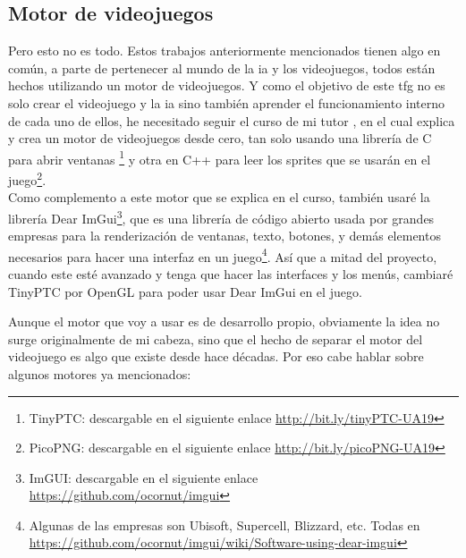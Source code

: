 \subsection{Motor de videojuegos}
Pero esto no es todo. Estos trabajos anteriormente mencionados tienen algo en común, a parte de pertenecer al mundo de la \gls{ia} y los videojuegos, todos están hechos utilizando un motor de videojuegos. Y como el objetivo de este \gls{tfg} no es solo crear el videojuego y la \gls{ia} sino también aprender el funcionamiento interno de cada uno de ellos, he necesitado seguir el curso de mi tutor \cite{CursoMotorC++} , en el cual explica y crea un motor de videojuegos desde cero, tan solo usando una librería de C para abrir ventanas \footnote{TinyPTC: descargable en el siguiente enlace \url{http://bit.ly/tinyPTC-UA19}} y otra en C++ para leer los sprites que se usarán en el juego\footnote{PicoPNG: descargable en el siguiente enlace \url{http://bit.ly/picoPNG-UA19}}.
\\
Como complemento a este motor que se explica en el curso, también usaré la librería Dear ImGui\footnote{ImGUI: descargable en el siguiente enlace \url{https://github.com/ocornut/imgui}}, que es una librería de código abierto usada por grandes empresas para la renderización de ventanas, texto, botones, y demás elementos necesarios para hacer una interfaz en un juego\footnote{Algunas de las empresas son Ubisoft, Supercell, Blizzard, etc. Todas en \url{https://github.com/ocornut/imgui/wiki/Software-using-dear-imgui}}. Así que a mitad del proyecto, cuando este esté avanzado y tenga que hacer las interfaces y los menús, cambiaré TinyPTC por OpenGL para poder usar Dear ImGui en el juego.

Aunque el motor que voy a usar es de desarrollo propio, obviamente la idea no surge originalmente de mi cabeza, sino que el hecho de separar el motor del videojuego es algo que existe desde hace décadas. Por eso cabe hablar sobre algunos motores ya mencionados:

